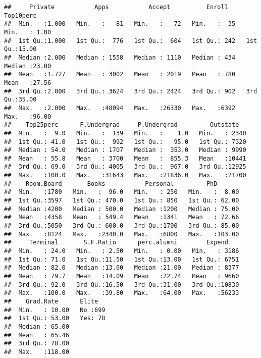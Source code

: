 \documentclass[
]{article}
\newenvironment{Shaded}{\begin{snugshade}}{\end{snugshade}}
\newcommand{\AttributeTok}[1]{\textcolor[rgb]{0.77,0.63,0.00}{#1}}
\newcommand{\CommentTok}[1]{\textcolor[rgb]{0.56,0.35,0.01}{\textit{#1}}}
\newcommand{\FunctionTok}[1]{\textcolor[rgb]{0.00,0.00,0.00}{#1}}
\newcommand{\NormalTok}[1]{#1}
\newcommand{\SpecialCharTok}[1]{\textcolor[rgb]{0.00,0.00,0.00}{#1}}
\newcommand{\StringTok}[1]{\textcolor[rgb]{0.31,0.60,0.02}{#1}}
\begin{document}
\begin{verbatim}
##     Private           Apps           Accept          Enroll       Top10perc    
##  Min.   :1.000   Min.   :   81   Min.   :   72   Min.   :  35   Min.   : 1.00  
##  1st Qu.:1.000   1st Qu.:  776   1st Qu.:  604   1st Qu.: 242   1st Qu.:15.00  
##  Median :2.000   Median : 1558   Median : 1110   Median : 434   Median :23.00  
##  Mean   :1.727   Mean   : 3002   Mean   : 2019   Mean   : 780   Mean   :27.56  
##  3rd Qu.:2.000   3rd Qu.: 3624   3rd Qu.: 2424   3rd Qu.: 902   3rd Qu.:35.00  
##  Max.   :2.000   Max.   :48094   Max.   :26330   Max.   :6392   Max.   :96.00  
##    Top25perc      F.Undergrad     P.Undergrad         Outstate    
##  Min.   :  9.0   Min.   :  139   Min.   :    1.0   Min.   : 2340  
##  1st Qu.: 41.0   1st Qu.:  992   1st Qu.:   95.0   1st Qu.: 7320  
##  Median : 54.0   Median : 1707   Median :  353.0   Median : 9990  
##  Mean   : 55.8   Mean   : 3700   Mean   :  855.3   Mean   :10441  
##  3rd Qu.: 69.0   3rd Qu.: 4005   3rd Qu.:  967.0   3rd Qu.:12925  
##  Max.   :100.0   Max.   :31643   Max.   :21836.0   Max.   :21700  
##    Room.Board       Books           Personal         PhD        
##  Min.   :1780   Min.   :  96.0   Min.   : 250   Min.   :  8.00  
##  1st Qu.:3597   1st Qu.: 470.0   1st Qu.: 850   1st Qu.: 62.00  
##  Median :4200   Median : 500.0   Median :1200   Median : 75.00  
##  Mean   :4358   Mean   : 549.4   Mean   :1341   Mean   : 72.66  
##  3rd Qu.:5050   3rd Qu.: 600.0   3rd Qu.:1700   3rd Qu.: 85.00  
##  Max.   :8124   Max.   :2340.0   Max.   :6800   Max.   :103.00  
##     Terminal       S.F.Ratio      perc.alumni        Expend     
##  Min.   : 24.0   Min.   : 2.50   Min.   : 0.00   Min.   : 3186  
##  1st Qu.: 71.0   1st Qu.:11.50   1st Qu.:13.00   1st Qu.: 6751  
##  Median : 82.0   Median :13.60   Median :21.00   Median : 8377  
##  Mean   : 79.7   Mean   :14.09   Mean   :22.74   Mean   : 9660  
##  3rd Qu.: 92.0   3rd Qu.:16.50   3rd Qu.:31.00   3rd Qu.:10830  
##  Max.   :100.0   Max.   :39.80   Max.   :64.00   Max.   :56233  
##    Grad.Rate      Elite    
##  Min.   : 10.00   No :699  
##  1st Qu.: 53.00   Yes: 78  
##  Median : 65.00            
##  Mean   : 65.46            
##  3rd Qu.: 78.00            
##  Max.   :118.00
\end{verbatim}

\begin{Shaded}
\end{Shaded}
\end{document}
